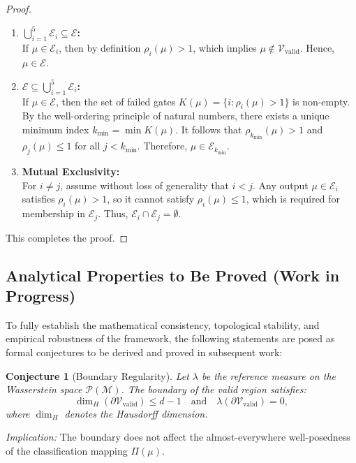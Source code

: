 \documentclass[11pt,a4paper]{article}
\theoremstyle{plain}
\newtheorem{conjecture}{Conjecture}[section]
\begin{document}
	\begin{proof}
		\begin{enumerate}
			\item \textbf{$\bigcup_{i=1}^5 \mathcal{E}_i \subseteq \mathcal{E}$:}\\
			If $\mu \in \mathcal{E}_i$, then by definition $\rho_i(\mu) > 1$, which implies $\mu \notin \mathcal{V}_{\text{valid}}$. Hence, $\mu \in \mathcal{E}$.
			
			\item \textbf{$\mathcal{E} \subseteq \bigcup_{i=1}^5 \mathcal{E}_i$:}\\
			If $\mu \in \mathcal{E}$, then the set of failed gates $K(\mu) = \{i : \rho_i(\mu) > 1\}$ is non-empty. By the well-ordering principle of natural numbers, there exists a unique minimum index $k_{\min} = \min K(\mu)$. It follows that $\rho_{k_{\min}}(\mu) > 1$ and $\rho_j(\mu) \le 1$ for all $j < k_{\min}$. Therefore, $\mu \in \mathcal{E}_{k_{\min}}$.
			
			\item \textbf{Mutual Exclusivity:}\\
			For $i \neq j$, assume without loss of generality that $i < j$. Any output $\mu \in \mathcal{E}_i$ satisfies $\rho_i(\mu) > 1$, so it cannot satisfy $\rho_i(\mu) \le 1$, which is required for membership in $\mathcal{E}_j$. Thus, $\mathcal{E}_i \cap \mathcal{E}_j = \emptyset$.
		\end{enumerate}
		This completes the proof.
	\end{proof}
	
	\subsection{Analytical Properties to Be Proved (Work in Progress)}
	
	To fully establish the mathematical consistency, topological stability, and empirical robustness of the framework, the following statements are posed as formal conjectures to be derived and proved in subsequent work:
	
	\begin{conjecture}[Boundary Regularity]
		Let $\lambda$ be the reference measure on the Wasserstein space $\mathcal{P}(\mathcal{M})$. The boundary of the valid region satisfies:
		\[
		\dim_H(\partial\mathcal{V}_{\text{valid}}) \le d-1 \quad \text{and} \quad \lambda(\partial\mathcal{V}_{\text{valid}}) = 0,
		\]
		where $\dim_H$ denotes the Hausdorff dimension.
	\end{conjecture}
	\noindent\textit{Implication:} The boundary does not affect the almost-everywhere well-posedness of the classification mapping $\Pi(\mu)$.
	
\end{document}
